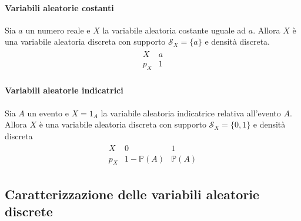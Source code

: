 \documentclass[a4paper,12pt]{article}
\begin{document}
\paragraph{Variabili aleatorie costanti} Sia $a$ un numero reale e $X$ la variabile aleatoria costante uguale ad $a$. Allora $X$ è una variabile aleatoria discreta con supporto $\mathcal{S}_X = \{a\}$ e densità discreta.
\begin{align*}
  \begin{array}{c|c}
  X & a \\
  \hline
  p_X & 1
  \end{array}
\end{align*}
\paragraph{Variabili aleatorie indicatrici} Sia $A$ un evento e $X = 1_A$ la variabile aleatoria indicatrice relativa all’evento $A$. Allora $X$ è una variabile aleatoria discreta con supporto $\mathcal{S}_X = \{0, 1\}$ e densità discreta
\begin{align*}
  \begin{array}{c|c|c}
  X & 0 & 1 \\
  \hline
  p_X & 1-\mathbb{P}(A) & \mathbb{P}(A)
  \end{array}
\end{align*}
\subsection{Caratterizzazione delle variabili aleatorie discrete}
\end{document}
